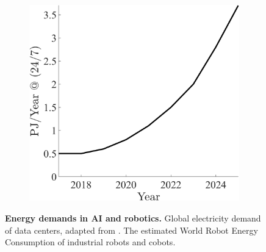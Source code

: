 \documentclass[12pt]{article}
\begin{document}
\begin{figure}[!t]
\begin{subfigure}[t]{0.32\textwidth}
	\end{subfigure}
	\hfill
	\begin{subfigure}[t]{0.32\textwidth}
		\subcaption{}
		\includegraphics[width=\textwidth]{cb_energy_projections.png} \label{fig:cobot_energy}
	\end{subfigure}	
	\hspace*{\fill}
	\caption[] {\label{fig:energy_demands_AI_robotics} \textbf{Energy demands in AI and robotics.}  Global electricity demand of data centers, adapted from \cite{andrae2015global}. The estimated World Robot Energy Consumption of  industrial robots and  cobots.}
\end{figure}

\end{document}
